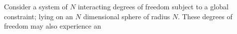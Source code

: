Consider a system of $N$ interacting degrees of freedom subject to a global constraint; lying on an $N$ dimensional sphere of radius $N$. These degrees of freedom may also experience an 